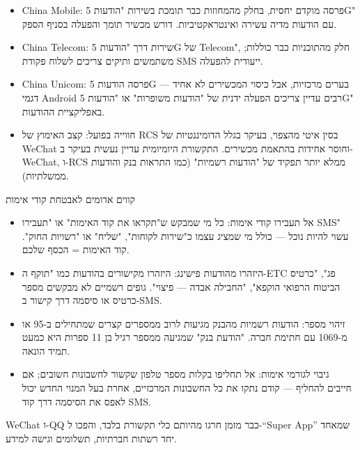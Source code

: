 
\begin{itemize}
  \item China Mobile: פרסה מוקדם יחסית, בחלק מהמחוזות כבר תומכת בשירות "הודעות 5G" עם הודעות מדיה עשירה ואינטראקטיביות. דורש מכשיר תומך והפעלה בסניף הספק.
  \item China Telecom: שירות דרך "הודעות 5G של Telecom", חלק מהתוכניות כבר כוללות; משתמשים ותיקים צריכים לשלוח פקודת SMS ייעודית להפעלה.
  \item China Unicom: פרסה הודעות 5G בערים מרכזיות, אבל כיסוי המכשירים לא אחיד — דגמי Android רבים עדיין צריכים הפעלה ידנית של "הודעות משופרות" או "הודעות 5G" באפליקציית ההודעות.
  \item חווייה בפועל: קצב האימוץ של RCS בסין איטי מהצפוי, בעיקר בגלל הדומיננטיות של WeChat וחוסר אחידות בהתאמת מכשירים. התקשורת היומיומית עדיין נעשית בעיקר ב-WeChat, ו-RCS ממלא יותר תפקיד של "הודעות רשמיות" (כמו התראות בנק והודעות ממשלתיות).
\end{itemize}

\begin{tcbwarn}{קווים אדומים לאבטחת קודי אימות}
\begin{itemize}
  \item אל תעבירו קודי אימות: כל מי שמבקש ש"תקראו את קוד האימות" או "תעבירו SMS" עשוי להיות נוכל — כולל מי שמציג עצמו כ"שירות לקוחות", "שליח" או "רשויות החוק". קוד האימות = הכסף שלכם.
  \item היזהרו מהודעות פישינג: היזהרו מקישורים בהודעות כמו "תוקף ה-ETC פג", "כרטיס הביטוח הרפואי הוקפא", "החבילה אבדה — פיצוי". גופים רשמיים לא מבקשים מספר כרטיס או סיסמה דרך קישור ב-SMS.
  \item זיהוי מספר: הודעות רשמיות מהבנק מגיעות לרוב ממספרים קצרים שמתחילים ב-95 או מ-1069 עם חתימת חברה. "הודעת בנק" שמגיעה ממספר רגיל בן 11 ספרות היא כמעט תמיד הונאה.
  \item גיבוי לגורמי אימות: אל תחליפו בקלות מספר טלפון שקשור לחשבונות חשובים; אם חייבים להחליף — קודם נתקו את כל החשבונות המרכזיים, אחרת בעל המנוי החדש יכול לאפס את הסיסמה דרך קוד SMS.
\end{itemize}

\end{tcbwarn}


WeChat ו-QQ כבר מזמן חרגו מהיותם כלי תקשורת בלבד, והפכו ל-“Super App” שמאחד יחד רשתות חברתיות, תשלומים וגישה למידע.


